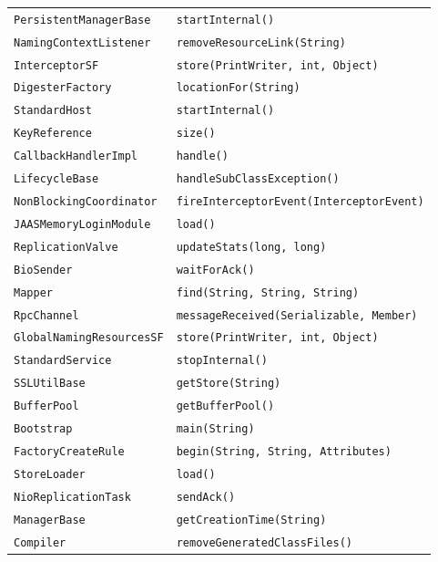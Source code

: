 \begin{center}
\begin{longtable}{ll}
 \lstinline/PersistentManagerBase/&{\hspace*{-2pt}\lstinline/startInternal()/}\\
 \lstinline/NamingContextListener/&{\lstinline/removeResourceLink(String)/}\\
 \lstinline/InterceptorSF/&{\lstinline/store(PrintWriter, int, Object)/}\\
 \lstinline/DigesterFactory/&{\lstinline/locationFor(String)/}\\
 \lstinline/StandardHost/&{\hspace*{-2pt}\lstinline/startInternal()/}\\
 \lstinline/KeyReference/&{\lstinline/size()/}\\
 \lstinline/CallbackHandlerImpl/&{\lstinline/handle()/}\\
 \lstinline/LifecycleBase/&{\lstinline/handleSubClassException()/}\\
 \lstinline/NonBlockingCoordinator/&{\lstinline/fireInterceptorEvent(InterceptorEvent)/}\\
 \lstinline/JAASMemoryLoginModule/&{\lstinline/load()/}\\
 \lstinline/ReplicationValve/&{\lstinline/updateStats(long, long)/}\\
 \lstinline/BioSender/&{\lstinline/waitForAck()/}\\
 \lstinline/Mapper/&{\lstinline/find(String, String, String)/}\\
 \lstinline/RpcChannel/&{\lstinline/messageReceived(Serializable, Member)/}\\
 \lstinline/GlobalNamingResourcesSF/&{\lstinline/store(PrintWriter, int, Object)/}\\
 \lstinline/StandardService/&{\lstinline/stopInternal()/}\\
 \lstinline/SSLUtilBase/&{\lstinline/getStore(String)/}\\
 \lstinline/BufferPool/&{\lstinline/getBufferPool()/}\\
 \lstinline/Bootstrap/&{\lstinline/main(String)/}\\
 \lstinline/FactoryCreateRule/&{\lstinline/begin(String, String, Attributes)/}\\
 \lstinline/StoreLoader/&{\lstinline/load()/}\\
  \lstinline/NioReplicationTask/&{\lstinline/sendAck()/}\\
 \lstinline/ManagerBase/&{\lstinline/getCreationTime(String)/}\\
 \lstinline/Compiler/&{\lstinline/removeGeneratedClassFiles()/}\\

\end{longtable}
\end{center}
